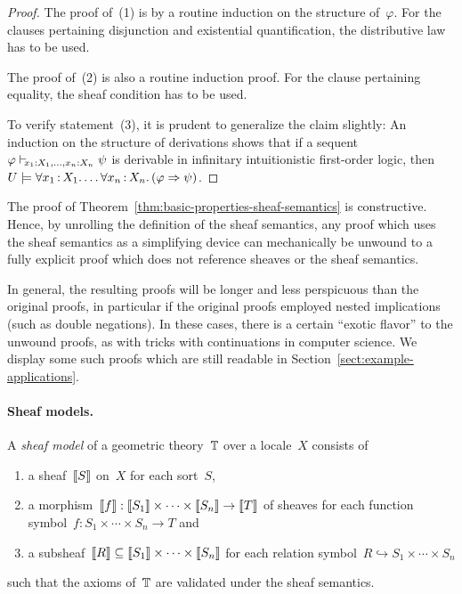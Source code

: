 \documentclass{ws-rv9x6}
\begin{document}
{\begin{proof}The proof of~(1) is by a routine induction on the structure
of~$\varphi$. For the clauses pertaining disjunction and existential
quantification, the distributive law has to be used.

The proof of~(2) is also a routine induction proof. For the clause pertaining
equality, the sheaf condition has to be used.

To verify statement~(3), it is prudent to generalize the claim slightly: An
induction on the structure of derivations shows that if a sequent~$\varphi
\mathrel{\vdash\!\!\!_{x_1{:}X_1,\ldots,x_n{:}X_n}} \psi$ is derivable in infinitary intuitionistic first-order
logic, then~$U \models \forall x_1\,{:}\,X_1\mathpunct{.} \ldots \forall x_n\,{:}\,X_n\mathpunct{.} (\varphi
\Rightarrow \psi)$.
\end{proof}

\begin{remark}The proof of Theorem~\ref{thm:basic-properties-sheaf-semantics}
is constructive. Hence, by unrolling the definition of the sheaf semantics, any
proof which uses the sheaf semantics as a simplifying device can mechanically
be unwound to a fully explicit proof which does not reference sheaves or the
sheaf semantics.

In general, the resulting proofs will be longer and less perspicuous
than the original proofs, in particular if the original proofs employed nested
implications (such as double negations). In these cases, there is a certain
``exotic flavor'' to the unwound proofs, as with tricks with continuations in
computer science. We display some such proofs which are still readable in
Section~\ref{sect:example-applications}.
\end{remark}


\paragraph{Sheaf models.}
\begin{definition}\label{defn:sheaf-model}
A \emph{sheaf model} of a geometric theory~$\mathbb{T}$ over a locale~$X$ consists of
\begin{enumerate}
  \item a sheaf~${\llbracket{S}\rrbracket}$ on~$X$ for each sort~$S$,
  \item a morphism~${\llbracket{f}\rrbracket} : {\llbracket{S_1}\rrbracket} \times \cdots \times {\llbracket{S_n}\rrbracket} \to
  {\llbracket{T}\rrbracket}$ of sheaves for each function symbol~$f : S_1 \times \cdots \times S_n \to T$ and
  \item a subsheaf~${\llbracket{R}\rrbracket} \subseteq {\llbracket{S_1}\rrbracket} \times \cdots \times {\llbracket{S_n}\rrbracket}$
  for each relation symbol~$R \hookrightarrow S_1 \times \cdots \times S_n$
\end{enumerate}
such that the axioms of~$\mathbb{T}$ are validated under the sheaf semantics.
\end{definition}

}
\end{document}
